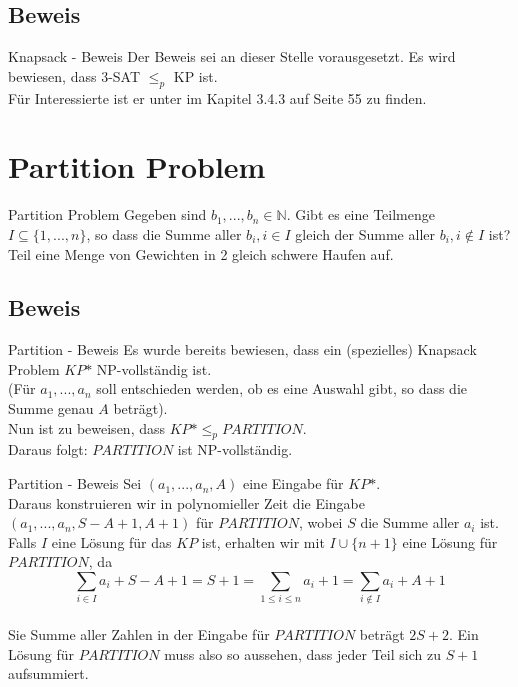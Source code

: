 \documentclass[12pt,donthandout,notes=dontshow,xcolor=table]{beamer}
\begin{document}
\subsection{Beweis}
\begin{frame}{Knapsack - Beweis}
Der Beweis sei an dieser Stelle vorausgesetzt.
Es wird bewiesen, dass 3-SAT \(\le_p\) KP ist.\\
Für Interessierte ist er unter \cite{wegener} im Kapitel 3.4.3 auf Seite 55 zu finden.
\end{frame}



\section{Partition Problem}
\begin{frame}{Partition Problem}
Gegeben sind \(b_1,...,b_n \in \mathbb{N}\). Gibt es eine Teilmenge \(I \subseteq \{1,...,n\}\), so dass die Summe aller \(b_i, i \in I\) gleich der Summe aller \(b_i, i \notin I\) ist?\\
\textrightarrow Teil eine Menge von Gewichten in 2 gleich schwere Haufen auf.
\end{frame}

\subsection{Beweis}
\begin{frame}{Partition - Beweis}
Es wurde bereits bewiesen, dass ein (spezielles) Knapsack Problem \(KP\mbox{*}\) NP-vollständig ist.\\
(Für \(a_1,...,a_n\) soll entschieden werden, ob es eine Auswahl gibt, so dass die Summe genau \(A\) beträgt).\\
Nun ist zu beweisen, dass \(KP\mbox{*} \leq_p PARTITION\).\\
Daraus folgt: \(PARTITION\) ist NP-vollständig.
\end{frame}

\begin{frame}{Partition - Beweis}
Sei \((a_1,...,a_n,A)\) eine Eingabe für \(KP\mbox{*}\).\\
Daraus konstruieren wir in polynomieller Zeit die Eingabe\\
\((a_1,...,a_n,S-A+1,A+1)\) für \(PARTITION\), wobei \(S\) die Summe aller \(a_i\) ist.\\
Falls \(I\) eine Lösung für das \(KP\) ist, erhalten wir mit \(I \cup \{n+1\}\) eine Lösung für \(PARTITION\), da\\
$$\sum_{i \in I}a_i + S - A + 1 = S + 1 = \sum_{1 \le i \le n}a_i + 1 = \sum_{i \notin I}a_i + A + 1$$\\
Sie Summe aller Zahlen in der Eingabe für \(PARTITION\) beträgt \(2S + 2\).
Ein Lösung für \(PARTITION\) muss also so aussehen, dass jeder Teil sich zu \(S + 1\) aufsummiert.
\end{frame}
\end{document}
